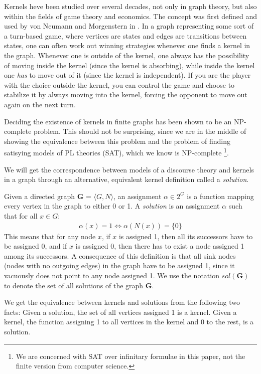 Kernels heve been studied over several decades, not only in graph theory, but also within the fields of game theory and economics.
The concept was first defined and used by von Neumann and Morgenstern in \cite{neumann}.
In a graph representing some sort of a turn-based game, where vertices are states and edges are transitions between states, one can often work out winning strategies whenever one finds a kernel in the graph.
Whenever one is outside of the kernel, one always has the possibility of moving inside the kernel (since the kernel is absorbing), while inside the kernel one \textit{has} to move out of it (since the kernel is independent).
If you are the player with the choice outside the kernel, you can control the game and choose to stabilize it by always moving into the kernel, forcing the opponent to move out again on the next turn.

Deciding the existence of kernels in finite graphs has been shown to be an NP-complete problem\cite{chvatal}.
This should not be surprising, since we are in the middle of showing the equivalence between this problem and the problem of finding satisying models of PL theories (SAT), which we know is NP-complete \footnote{We are concerned with SAT over infinitary formulae in this paper, not the finite version from computer science.}.

We will get the correspondence between models of a discourse theory and kernels in a graph through an alternative, equivalent kernel definition called a \textit{solution}.

Given a directed graph \textbf{G} = $\langle G,N \rangle$, an assignment $\alpha \in 2^G$ is a function mapping every vertex in the graph to either 0 or 1.
A \textit{solution} is an assignment $\alpha$ such that for all $x \in G:$
\begin{align}
  \alpha(x) = 1 \iff \alpha(N(x)) = \{ 0 \}
\end{align}
This means that for any node $x$, if $x$ is assigned 1, then all its successors have to be assigned  0, and if $x$ is assigned 0, then there has to exist a node assigned 1 among its successors.
A consequence of this definition is that all sink nodes (nodes with no outgoing edges) in the graph have to be assigned 1, since it vacuously does not point to any node assigned 1.
We use the notation $sol(\mathbf{G})$ to denote the set of all solutions of the graph \textbf{G}.

We get the equivalence between kernels and solutions from the following two facts:
Given a solution, the set of all vertices assigned 1 is a kernel.
Given a kernel, the function assigning 1 to all vertices in the kernel and 0 to the rest, is a solution.
